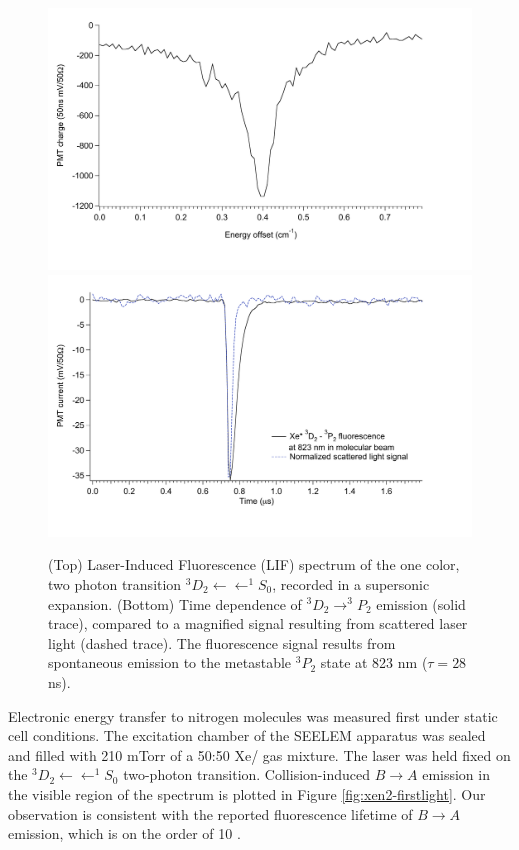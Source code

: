\documentclass[12pt]{mitthesis}
\begin{document}
\begin{figure}
  \caption{(Top) Laser-Induced Fluorescence (LIF) spectrum of the one
    color, two photon transition  $^3D_2 \leftarrow \leftarrow
    ^1S_0$, recorded in a supersonic expansion.  (Bottom) Time
    dependence of  $^3D_2 \rightarrow ^3P_2$ emission (solid
    trace), compared to a magnified signal resulting from scattered
    laser light (dashed trace). The fluorescence signal results from
    spontaneous emission to the metastable $^3P_2$ state at 823 nm
    ($\tau = 28$ ns).  }
  \label{fig:xe-beam}
  \centering
  \includegraphics[width=6in]{Xe-beamlif-060406.pdf}
  \includegraphics[width=6in]{Xe-beamtrc-060406.pdf}
\end{figure}

Electronic energy transfer to nitrogen molecules was measured first
under static cell conditions.  The excitation chamber of the SEELEM
apparatus was sealed and filled with 210 mTorr of a 50:50 Xe/
gas mixture.  The laser was held fixed on the  $^3D_2
\leftarrow \leftarrow ^1S_0$ two-photon transition.  Collision-induced
 $B \rightarrow A$ emission in the visible region of the
spectrum is plotted in Figure \ref{fig:xen2-firstlight}.  Our
observation is consistent with the reported fluorescence lifetime of
 $B \rightarrow A$ emission, which is on the order of 10
\microsec.
\end{document}
